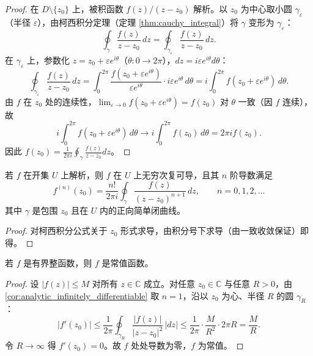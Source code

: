 \begin{proof}
在 $D \setminus \{z_0\}$ 上，被积函数 $f(z)/(z-z_0)$ 解析。以 $z_0$ 为中心取小圆 $\gamma_\varepsilon$（半径 $\varepsilon$），由柯西积分定理（定理 \ref{thm:cauchy_integral}）将 $\gamma$ 变形为 $\gamma_\varepsilon$：
\[
\oint_\gamma \frac{f(z)}{z-z_0}\,dz = \oint_{\gamma_\varepsilon} \frac{f(z)}{z-z_0}\,dz.
\]
在 $\gamma_\varepsilon$ 上，参数化 $z = z_0 + \varepsilon e^{i\theta}$（$\theta: 0 \to 2\pi$），$dz = i\varepsilon e^{i\theta}d\theta$：
\[
\oint_{\gamma_\varepsilon} \frac{f(z)}{z-z_0}\,dz = \int_0^{2\pi} \frac{f(z_0 + \varepsilon e^{i\theta})}{\varepsilon e^{i\theta}} \cdot i\varepsilon e^{i\theta}\,d\theta = i\int_0^{2\pi} f(z_0 + \varepsilon e^{i\theta})\,d\theta.
\]
由 $f$ 在 $z_0$ 处的连续性，$\lim_{\varepsilon \to 0} f(z_0 + \varepsilon e^{i\theta}) = f(z_0)$ 对 $\theta$ 一致（因 $f$ 连续），故
\[
i\int_0^{2\pi} f(z_0 + \varepsilon e^{i\theta})\,d\theta \to i\int_0^{2\pi} f(z_0)\,d\theta = 2\pi i f(z_0).
\]
因此 $f(z_0) = \frac{1}{2\pi i}\oint_\gamma \frac{f(z)}{z-z_0}dz$。
\end{proof}

\begin{corollary}[解析函数的无穷可微性]\label{cor:analytic_infinitely_differentiable}
若 $f$ 在开集 $U$ 上解析，则 $f$ 在 $U$ 上无穷次复可导，且其 $n$ 阶导数满足
\[
f^{(n)}(z_0) = \frac{n!}{2\pi i} \oint_\gamma \frac{f(z)}{(z - z_0)^{n+1}}\,dz, \qquad n = 0, 1, 2, \dots
\]
其中 $\gamma$ 是包围 $z_0$ 且在 $U$ 内的正向简单闭曲线。
\end{corollary}

\begin{proof}
对柯西积分公式关于 $z_0$ 形式求导，由积分号下求导（由一致收敛保证）即得。
\end{proof}

\begin{theorem}[刘维尔定理]\label{thm:liouville}
若 $f$ 是有界整函数，则 $f$ 是常值函数。
\end{theorem}

\begin{proof}
设 $|f(z)| \le M$ 对所有 $z \in \mathbb{C}$ 成立。对任意 $z_0 \in \mathbb{C}$ 与任意 $R > 0$，由 \cref{cor:analytic_infinitely_differentiable} 取 $n = 1$，沿以 $z_0$ 为心、半径 $R$ 的圆 $\gamma_R$：
\[
|f'(z_0)| \le \frac{1}{2\pi} \oint_{\gamma_R} \frac{|f(z)|}{|z-z_0|^2}\,|dz| \le \frac{1}{2\pi} \cdot \frac{M}{R^2} \cdot 2\pi R = \frac{M}{R}.
\]
令 $R \to \infty$ 得 $f'(z_0) = 0$。故 $f$ 处处导数为零，$f$ 为常值。
\end{proof}

